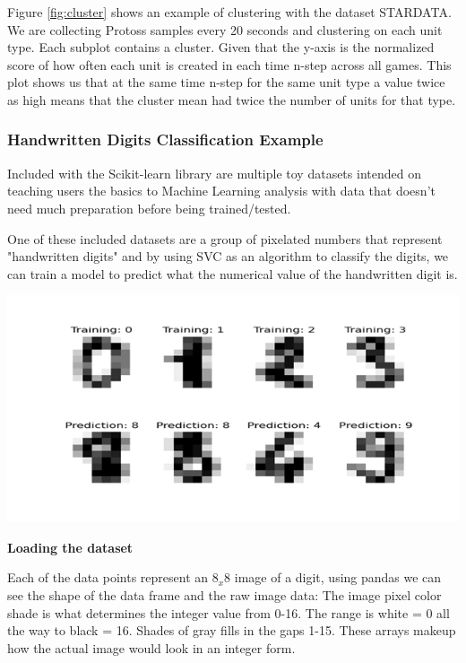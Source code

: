 \documentclass[a4paper,12pt]{report}
\newcommand{\msection}[1]{\noindent\textbf{#1}}
\begin{document}
Figure \ref{fig:cluster} shows an example of clustering with the dataset STARDATA. We are collecting Protoss samples every 20 seconds and clustering on each unit type. Each subplot contains a cluster. Given that the y-axis is the normalized score of how often each unit is created in each time n-step across all games. This plot shows us that at the same time n-step for the same unit type a value twice as high means that the cluster mean had twice the number of units for that type.

\subsubsection{Handwritten Digits Classification Example}

Included with the Scikit-learn library are multiple toy datasets intended on teaching users the basics to Machine Learning analysis with data that doesn’t need much preparation before being trained/tested.

One of these included datasets are a group of pixelated numbers that represent "handwritten digits" and by using SVC as an algorithm to classify the digits, we can train a model to predict what the numerical value of the handwritten digit is.

\begin{center}
    \captionsetup{type=figure}
    \includegraphics[width=.9\linewidth]{media/digit.png}
\end{center}

\msection{Loading the dataset}

Each of the data points represent an $8_x8$ image of a digit, using pandas we can see the shape of the data frame and the raw image data:
The image pixel color shade is what determines the integer value from 0-16. The range is white = 0 all the way to black = 16. Shades of gray fills in the gaps 1-15. These arrays makeup how the actual image would look in an integer form.	
\end{document}
